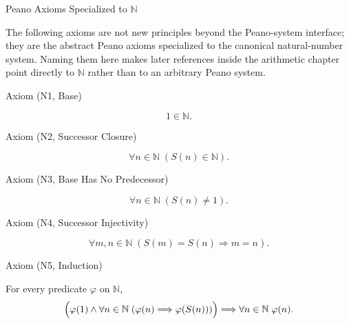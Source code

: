 \begin{topicbox}{Peano Axioms Specialized to \texorpdfstring{$\mathbb{N}$}{N}}
\begin{exposition}
The following axioms are not new principles beyond the Peano-system interface;
they are the abstract Peano axioms specialized to the canonical natural-number
system. Naming them here makes later references inside the arithmetic chapter
point directly to $\mathbb{N}$ rather than to an arbitrary Peano system.
\end{exposition}

\begin{axiombox}{Axiom (N1, Base)}
\begin{axiom}[N1, Base]
\label{ax:n-base}
\[
1 \in \mathbb{N}.
\]
\end{axiom}
\end{axiombox}

\NoLocalDependencies

\begin{axiombox}{Axiom (N2, Successor Closure)}
\begin{axiom}
\label{ax:n-successor-closure}
\[
\forall n \in \mathbb{N}\;(S(n)\in \mathbb{N}).
\]
\end{axiom}
\end{axiombox}

\NoLocalDependencies

\begin{axiombox}{Axiom (N3, Base Has No Predecessor)}
\begin{axiom}
\label{ax:n-base-has-no-predecessor}
\[
\forall n \in \mathbb{N}\;(S(n)\ne 1).
\]
\end{axiom}
\end{axiombox}

\NoLocalDependencies

\begin{axiombox}{Axiom (N4, Successor Injectivity)}
\begin{axiom}
\label{ax:n-successor-injective}
\[
\forall m,n \in \mathbb{N}\;(S(m)=S(n)\Longrightarrow m=n).
\]
\end{axiom}
\end{axiombox}

\NoLocalDependencies

\begin{axiombox}{Axiom (N5, Induction)}
\begin{axiom}[N5, Induction]
\label{ax:n-induction}
For every predicate $\varphi$ on $\mathbb{N}$,
\[
\Bigl(\varphi(1)\land
\forall n\in\mathbb{N}\;(\varphi(n)\Longrightarrow \varphi(S(n)))\Bigr)
\Longrightarrow
\forall n\in\mathbb{N}\;\varphi(n).
\]
\end{axiom}
\end{axiombox}

\NoLocalDependencies
\end{topicbox}
